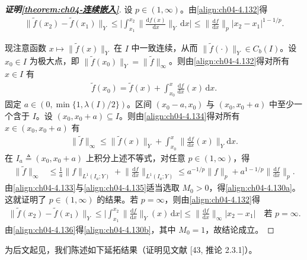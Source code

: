 \documentclass[../../main.tex]{subfiles}%
\begin{document}
\begin{proof}[\textbf{证明\cref{theorem:ch04-连续嵌入}}]
设 $p\in(1,\infty)$。由\eqref{align:ch04-4.132}得
\begin{align}
\|\tilde f(x_2)-\tilde f(x_1)\|_Y\leqslant\Big|\int_{x_1}^{x_2}\Big\|\frac{\mathrm{d}f(x)}{\mathrm{d}x}\Big\|_Y\,\mathrm{d}x\Big|
\leqslant\Big\|\frac{\mathrm{d}f}{\mathrm{d}x}\Big\|_p|x_2-x_1|^{1-1/p}. \label{align:ch04-4.133}
\end{align}

现注意函数 $x\mapsto\|\tilde f(x)\|_Y$ 在 $I$ 中一致连续，从而 $\|\tilde f(\cdot)\|_Y\in C_b(I)$。设 $x_0\in I$ 为极大点，即 $\|\tilde f(x_0)\|_Y=\|\tilde f\|_\infty$。则由\eqref{align:ch04-4.132}得对所有 $x\in I$ 有
\begin{align}
\tilde f(x_0)=\tilde f(x)+\int_{x_0}^x\frac{\mathrm{d}f}{\mathrm{d}x}(x)\,\mathrm{d}x. \label{align:ch04-4.134}
\end{align}
固定 $a\in(0,\min\{1,\lambda(I)/2\})$。区间 $(x_0-a,x_0)$ 与 $(x_0,x_0+a)$ 中至少一个含于 $I$。设 $(x_0,x_0+a)\subseteq I$。则由\eqref{align:ch04-4.134}得对所有 $x\in(x_0,x_0+a)$ 有
\begin{align*}
\|\tilde f\|_\infty\leqslant\|\tilde f(x)\|_Y+\int_{x_0}^x\Big\|\frac{\mathrm{d}f}{\mathrm{d}x}(x)\Big\|_Y\mathrm{d}x.
\end{align*}
在 $I_a\triangleq (x_0,x_0+a)$ 上积分上述不等式，对任意 $p\in(1,\infty)$，得
\begin{align}
\|\tilde f\|_\infty&\leqslant\frac1a\|f\|_{L^1(I_a;Y)}+\Big\|\frac{\mathrm{d}f}{\mathrm{d}x}\Big\|_{L^1(I_a;Y)}
\leqslant a^{-1/p}\|f\|_p+a^{1-1/p}\Big\|\frac{\mathrm{d}f}{\mathrm{d}x}\Big\|_p. \label{align:ch04-4.135}
\end{align}
由\eqref{align:ch04-4.133}与\eqref{align:ch04-4.135}适当选取 $M_0>0$，得\eqref{align:ch04-4.130a}。这就证明了 $p\in(1,\infty)$ 的结果。若 $p=\infty$，则由\eqref{align:ch04-4.132}得
\begin{align}
\|\tilde f(x_2)-\tilde f(x_1)\|_Y\leqslant\Big|\int_{x_1}^{x_2}\Big\|\frac{\mathrm{d}f}{\mathrm{d}x}\Big\|_Y(x)\,\mathrm{d}x\Big|
\leqslant\Big\|\frac{\mathrm{d}f}{\mathrm{d}x}\Big\|_\infty|x_2-x_1|\quad\text{若 }p=\infty. \label{align:ch04-4.136}
\end{align}
由\eqref{align:ch04-4.136}得\eqref{align:ch04-4.130b}，其中 $M_0=1$，故结论成立。
\end{proof}

为后文起见，我们陈述如下延拓结果（证明见文献 [43, 推论 2.3.1]）。
\end{document}
